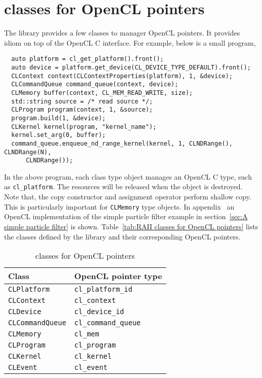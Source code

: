 \section{\protect\raii classes for OpenCL pointers}
\label{sec:RAII classes for OpenCL pointers}

The library provides a few classes to manager OpenCL pointers. It provides
\raii idiom on top of the OpenCL C interface. For example, below is a small
program,
\begin{Verbatim}
  auto platform = cl_get_platform().front();
  auto device = platform.get_device(CL_DEVICE_TYPE_DEFAULT).front();
  CLContext context(CLContextProperties(platform), 1, &device);
  CLCommandQueue command_queue(context, device);
  CLMemory buffer(context, CL_MEM_READ_WRITE, size);
  std::string source = /* read source */;
  CLProgram program(context, 1, &source);
  program.build(1, &device);
  CLKernel kernel(program, "kernel_name");
  kernel.set_arg(0, buffer);
  command_queue.enqueue_nd_range_kernel(kernel, 1, CLNDRange(), CLNDRange(N),
      CLNDRange());
\end{Verbatim}
In the above program, each class type object manages an OpenCL C type, such as
\verb|cl_platform|. The resources will be released when the object is
destroyed. Note that, the copy constructor and assignment operator perform
shallow copy. This is particularly important for \verb|CLMemory| type objects.
In appendix~ an OpenCL
implementation of the simple particle filter example in section~\ref{sec:A
  simple particle filter} is shown. Table~\ref{tab:RAII classes for OpenCL
  pointers} lists the classes defined by the library and their corresponding
OpenCL pointers.

\begin{table}
  \begin{tabularx}{\textwidth}{LL}
    \toprule
    Class & OpenCL pointer type \\
    \midrule
    \verb|CLPlatform|     & \verb|cl_platform_id|   \\
    \verb|CLContext|      & \verb|cl_context|       \\
    \verb|CLDevice|       & \verb|cl_device_id|     \\
    \verb|CLCommandQueue| & \verb|cl_command_queue| \\
    \verb|CLMemory|       & \verb|cl_mem|           \\
    \verb|CLProgram|      & \verb|cl_program|       \\
    \verb|CLKernel|       & \verb|cl_kernel|        \\
    \verb|CLEvent|        & \verb|cl_event|         \\
    \bottomrule
  \end{tabularx}
  \caption{\protect\raii classes for OpenCL pointers}
  \label{tab:RAII classes for OpenCL pointers}
\end{table}

